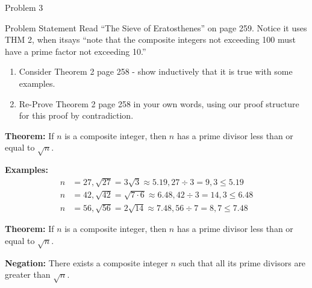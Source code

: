 \begin{problem}{Problem 3}
    \begin{statement}{Problem Statement}
        Read “The Sieve of Eratosthenes” on page 259. Notice it uses THM 2, when itsays “note that the composite integers not exceeding 100 must have a prime factor not exceeding 10.”
        \begin{enumerate}[label = (\alph*)]
            \item Consider Theorem 2 page 258 - show inductively that it is true with some examples.
            \item Re-Prove Theorem 2 page 258 in your own words, using our proof structure for this proof by contradiction.
        \end{enumerate}
    \end{statement}

    \begin{Highlight}
        \noindent \textbf{Theorem:} If $n$ is a composite integer, then $n$ has a prime divisor less than or equal to $\sqrt{n}$. \vspace*{1em}

        \noindent \textbf{Examples:} 
        \begin{align*}
            n & = 27, \sqrt{27} = 3\sqrt{3} \approx 5.19, 27 \div 3 = 9, 3 \leq 5.19 \\
            n & = 42, \sqrt{42} = \sqrt{7 \cdot 6} \approx 6.48, 42 \div 3 = 14, 3 \leq 6.48 \\
            n & = 56, \sqrt{56} = 2\sqrt{14} \approx 7.48, 56 \div 7 = 8, 7 \leq 7.48
        \end{align*}
    \end{Highlight}

    \begin{Highlight}
        \noindent \textbf{Theorem:} If $n$ is a composite integer, then $n$ has a prime divisor less than or equal to $\sqrt{n}$. \vspace*{1em}

        \noindent \textbf{Negation:} There exists a composite integer $n$ such that all its prime divisors are greater than $\sqrt{n}$. \vspace*{1em}


\end{Highlight}
\end{problem}
